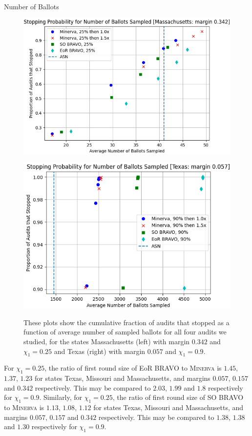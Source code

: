 \documentclass[final]{beamer}
\newcommand{\Minerva}{\textsc{Minerva}\xspace}
\newcommand{\BRAVO}{\textsc{BRAVO}\xspace}
\newlength{\colwidth}
\begin{document}
\begin{frame}[t]
\begin{columns}[t]
\begin{column}{\colwidth}
\begin{block}{Number of Ballots}
\begin{figure}[h]
\centering
\begin{minipage}{.49\textwidth}
\includegraphics[width=1\textwidth]{massachusetts25.png}
\label{fig:mass_25}
\end{minipage}
\begin{minipage}{.49\textwidth}
\includegraphics[width=1\textwidth]{texas90.png}
\label{fig:texas_90}
\end{minipage}
\caption{These plots show the cumulative fraction of audits that stopped as a function of average number of sampled ballots for all four audits we studied, for the states Massachusetts (left) with margin $0.342$ and $\chi_1=0.25$ and Texas (right) with margin $0.057$ and $\chi_1=0.9$.}
\end{figure}

For $\chi_1=0.25$, the ratio of first round size of EoR \BRAVO to \Minerva is $1.45$, $1.37$, $1.23$ for states Texas, Missouri and Massachusetts, and margins $0.057$, $0.157$ and $0.342$ respectively. This may be compared to $2.03$, $1.99$ and $1.8$ respectively for $\chi_1=0.9$. Similarly, for $\chi_1=0.25$, the ratio of first round size of SO \BRAVO to \Minerva is $1.13$, $1.08$, $1.12$ for states Texas, Missouri and Massachusetts, and margins $0.057$, $0.157$ and $0.342$ respectively. This may be compared to $1.38$, $1.38$ and $1.30$ respectively for $\chi_1=0.9$. 


\end{block}
\end{column}
\end{columns}
\end{frame}
\end{document}
